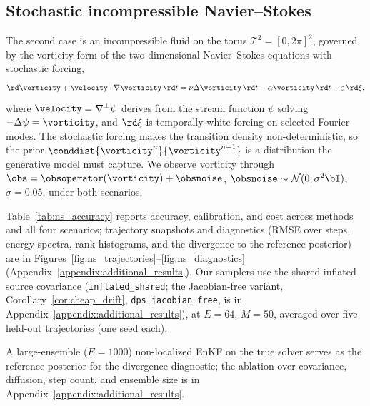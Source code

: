 \subsection{Stochastic incompressible Navier--Stokes}
\label{subsec:results_ns}
The second case is an incompressible fluid on the torus $\mathcal{T}^2=[0,2\pi]^2$, governed by the vorticity form of the two-dimensional Navier--Stokes equations with stochastic forcing,
\begin{align}\label{eq:ns_equation}
    \rd\vorticity + \velocity\cdot\nabla\vorticity\,\rd t
    = \nu\Delta\vorticity\,\rd t - \alpha\vorticity\,\rd t + \varepsilon\,\rd\xi,
\end{align}
where $\velocity=\nabla^\perp\psi$ derives from the stream function $\psi$ solving $-\Delta\psi=\vorticity$, and $\rd\xi$ is temporally white forcing on selected Fourier modes. The stochastic forcing makes the transition density non-deterministic, so the prior $\conddist{\vorticity^{n}}{\vorticity^{n-1}}$ is a distribution the generative model must capture. We observe vorticity through $\obs=\obsoperator(\vorticity)+\obsnoise$, $\obsnoise\sim\mathcal{N}(0,\sigma^2\bI)$, $\sigma=0.05$, under both scenarios.

Table~\ref{tab:ns_accuracy} reports accuracy, calibration, and cost across methods and all four scenarios; trajectory snapshots and diagnostics (RMSE over steps, energy spectra, rank histograms, and the divergence to the reference posterior) are in Figures~\ref{fig:ns_trajectories}--\ref{fig:ns_diagnostics} (Appendix~\ref{appendix:additional_results}). Our samplers use the shared inflated source covariance (\texttt{inflated\_shared}; the Jacobian-free variant, Corollary~\ref{cor:cheap_drift}, \texttt{dps\_jacobian\_free}, is in Appendix~\ref{appendix:additional_results}), at $E=64$, $M=50$, averaged over five held-out trajectories (one seed each).

A large-ensemble ($E=1000$) non-localized EnKF on the true solver serves as the reference posterior for the divergence diagnostic; the ablation over covariance, diffusion, step count, and ensemble size is in Appendix~\ref{appendix:additional_results}.

